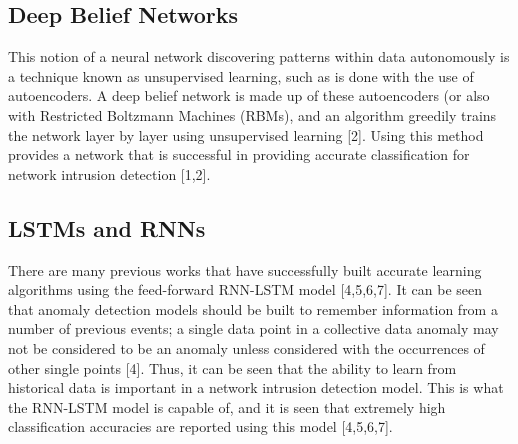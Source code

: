 \documentclass[a4paper]{article}
\begin{document}
\subsection{Deep Belief Networks}
\hspace*{10mm}This notion of a neural network discovering patterns within data autonomously is a technique known as unsupervised learning, such as is done with the use of autoencoders. A deep belief network is made up of these autoencoders (or also with Restricted Boltzmann Machines (RBMs), and an algorithm greedily trains the network layer by layer using unsupervised learning [2]. Using this method provides a network that is successful in providing accurate classification for network intrusion detection [1,2].

\subsection{LSTMs and RNNs}
\hspace*{10mm}There are many previous works that have successfully built accurate learning algorithms using the feed-forward RNN-LSTM model [4,5,6,7]. It can be seen that anomaly detection models should be built to remember information from a number of previous events; a single data point in a collective data anomaly may not be considered to be an anomaly unless considered with the occurrences of other single points [4]. Thus, it can be seen that the ability to learn from historical data is important in a network intrusion detection model. This is what the RNN-LSTM model is capable of, and it is seen that extremely high classification accuracies are reported using this model [4,5,6,7].
\end{document}
